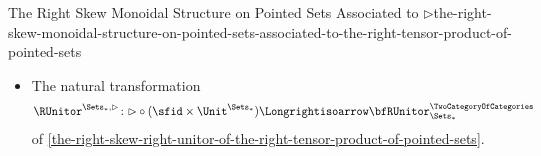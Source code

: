 \begin{proposition}{The Right Skew Monoidal Structure on Pointed Sets Associated to $\rhd$}{the-right-skew-monoidal-structure-on-pointed-sets-associated-to-the-right-tensor-product-of-pointed-sets}
\begin{itemize}
            \[
                \LUnitor^{\Sets_{*},\rhd}%
                \colon%
                \bfLUnitor^{\TwoCategoryOfCategories}_{\Sets_{*}}
                \Longrightisoarrow
                {\rhd}\circ{(\Unit^{\Sets_{*}}\times\id_{\Sets_{*}})}
            \]
            of \cref{the-right-skew-left-unitor-of-the-right-tensor-product-of-pointed-sets};
        \item{}The natural transformation
            \[
                \RUnitor^{\Sets_{*},\rhd}%
                \colon%
                {\rhd}\circ{({\sfid}\times{\Unit^{\Sets_{*}}})}%
                \Longrightisoarrow%
                \bfRUnitor^{\TwoCategoryOfCategories}_{\Sets_{*}}%
            \]
            of \cref{the-right-skew-right-unitor-of-the-right-tensor-product-of-pointed-sets}.
    \end{itemize}
\end{proposition}

